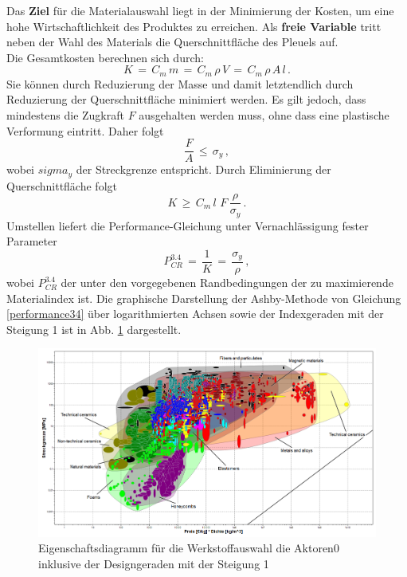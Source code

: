 Das \textbf{Ziel} für die Materialauswahl liegt in der Minimierung der Kosten, um eine hohe Wirtschaftlichkeit des Produktes zu erreichen. Als \textbf{freie Variable} tritt neben der Wahl des Materials die Querschnittfläche des Pleuels auf.\\
Die Gesamtkosten berechnen sich durch:
\begin{equation}
	K\,=\,C_m\,m\,=\,C_m\,\rho\,V\,=\,C_m\,\rho\,A\,l\,.
\end{equation}
Sie können durch Reduzierung der Masse und damit letztendlich durch Reduzierung der Querschnittfläche minimiert werden. Es gilt jedoch, dass mindestens die Zugkraft $F$ ausgehalten werden muss, ohne dass eine plastische Verformung eintritt. Daher folgt
\begin{equation}
	\frac{F}{A}\,\le\,\sigma_y\,,
\end{equation}
wobei $sigma_y$ der Streckgrenze entspricht.
Durch Eliminierung der Querschnittfläche folgt
\begin{equation}
K\,\ge\,C_m\,l\,\,F\,\frac{\rho}{\sigma_y}\,.
\end{equation}
Umstellen liefert die Performance-Gleichung unter Vernachlässigung fester Parameter
\begin{equation}\label{performance34}
P_{CR}^{3.4}\,=\,\frac{1}{K}\,=\,\frac{\sigma_y}{\rho}\,,
\end{equation}
wobei $P_{CR}^{3.4}$ der unter den vorgegebenen Randbedingungen der zu maximierende Materialindex ist. Die graphische Darstellung der Ashby-Methode von Gleichung \ref{performance34} über logarithmierten Achsen sowie der Indexgeraden mit der Steigung 1 ist in Abb. \ref{fig:ces_3_4_1} dargestellt.\\
\begin{figure}[H]
	\centering
	\includegraphics[width=1.0\linewidth]{chapter/Bilder/3_4_1}
	\caption{Eigenschaftsdiagramm für die Werkstoffauswahl die Aktoren0 inklusive der Designgeraden mit der Steigung 1}
	\label{fig:ces_3_4_1}
\end{figure}
